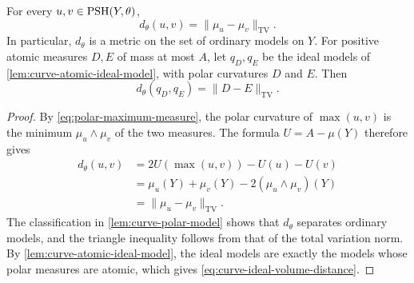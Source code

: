 \begin{theorem}\label{thm:curve-ideal-volume-distance}\label{thm:curve-model-volume-distance}
For every $u,v\in\mathrm{PSH}(Y,\theta)$,
\begin{equation}\label{eq:curve-model-volume-distance}
 d_\theta(u,v)=\|\mu_u-\mu_v\|_{\mathrm{TV}}.
\end{equation}
In particular, $d_\theta$ is a metric on the set of ordinary models on $Y$. For positive atomic measures $D,E$ of mass at most $A$, let $q_D,q_E$ be the ideal models of \cref{lem:curve-atomic-ideal-model}, with polar curvatures $D$ and $E$. Then
\begin{equation}\label{eq:curve-ideal-volume-distance}
 d_\theta(q_D,q_E)=\|D-E\|_{\mathrm{TV}}.
\end{equation}
\end{theorem}
\begin{proof}
By \eqref{eq:polar-maximum-measure}, the polar curvature of $\max(u,v)$ is the minimum $\mu_u\wedge\mu_v$ of the two measures. The formula $U=A-\mu(Y)$ therefore gives
\[
 \begin{split}
 d_\theta(u,v)&=2U(\max(u,v))-U(u)-U(v)\\
 &=\mu_u(Y)+\mu_v(Y)-2(\mu_u\wedge\mu_v)(Y)\\
 &=\|\mu_u-\mu_v\|_{\mathrm{TV}}.
 \end{split}
\]
The classification in \cref{lem:curve-polar-model} shows that $d_\theta$ separates ordinary models, and the triangle inequality follows from that of the total variation norm. By \cref{lem:curve-atomic-ideal-model}, the ideal models are exactly the models whose polar measures are atomic, which gives \eqref{eq:curve-ideal-volume-distance}.
\end{proof}

